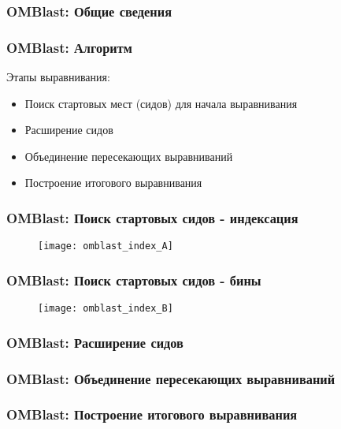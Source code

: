 \begin{frame}
\frametitle{OMBlast: Общие сведения}

\end{frame}

\begin{frame}
\frametitle{OMBlast: Алгоритм}

Этапы выравнивания:
\begin{itemize}
  \item Поиск стартовых мест (сидов) для начала выравнивания
  \item Расширение сидов
  \item Объединение пересекающих выравниваний
  \item Построение итогового выравнивания
\end{itemize}

\end{frame}

\begin{frame}
\frametitle{OMBlast: Поиск стартовых сидов - индексация}
  \begin{figure}
    \centering
    \texttt{[image: omblast\_index\_A]}
  \end{figure}
\end{frame}

\begin{frame}
\frametitle{OMBlast: Поиск стартовых сидов - бины}
  \begin{figure}
    \centering
    \texttt{[image: omblast\_index\_B]}
  \end{figure}
\end{frame}

\begin{frame}
\frametitle{OMBlast: Расширение сидов}

\end{frame}

\begin{frame}
\frametitle{OMBlast: Объединение пересекающих выравниваний}


\end{frame}

\begin{frame}
\frametitle{OMBlast: Построение итогового выравнивания}


\end{frame}
